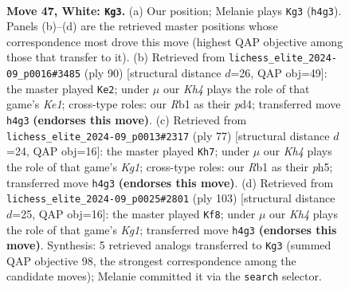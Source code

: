\documentclass[11pt]{article}
\begin{document}
\clearpage

\begin{figure}[p]\centering
\begin{subfigure}{0.46\textwidth}\centering
\resizebox{\linewidth}{!}{%
\newchessgame
\chessboard[
  setfen={8/1R3p2/p3pk2/8/P3P2K/5P1P/7r/1R6 w - - 0 47},
  showmover=false,
  pgfstyle=straightmove, color=movearrow, markmove={h4-g3}
]}
\caption{}
\end{subfigure}\hfill
\begin{subfigure}{0.46\textwidth}\centering
\resizebox{\linewidth}{!}{%
\newchessgame
\chessboard[
  setfen={8/1p6/4pk2/1R6/1P1pPP2/1r1P4/8/4K3 w - - 3 46},
  showmover=false,
  pgfstyle=straightmove, color=movearrow, markmove={e1-e2}
]}
\caption{}
\end{subfigure}
\\[4pt]
\begin{subfigure}{0.46\textwidth}\centering
\resizebox{\linewidth}{!}{%
\newchessgame
\chessboard[
  setfen={6k1/R5p1/5p2/7P/6P1/p4K2/r4P2/8 b - - 0 39},
  showmover=false,
  pgfstyle=straightmove, color=movearrow, markmove={g8-h7}
]}
\caption{}
\end{subfigure}\hfill
\begin{subfigure}{0.46\textwidth}\centering
\resizebox{\linewidth}{!}{%
\newchessgame
\chessboard[
  setfen={6k1/1R4p1/7p/7P/1p3P1K/1r4P1/8/8 b - - 1 52},
  showmover=false,
  pgfstyle=straightmove, color=movearrow, markmove={g8-f8}
]}
\caption{}
\end{subfigure}
\caption{\textbf{Move 47, White: \texttt{Kg3}.} (a) Our position; Melanie plays \texttt{Kg3} (\texttt{h4g3}). Panels (b)--(d) are the retrieved master positions whose correspondence most drove this move (highest QAP objective among those that transfer to it). (b) Retrieved from \texttt{lichess\_elite\_2024-09\_p0016\#3485} (ply 90) [structural distance $d$=26, QAP obj=49]: the master played \texttt{Ke2}; under $\mu$ our \emph{Kh4} plays the role of that game's \emph{Ke1}; cross-type roles: our \emph{R}b1 as their \emph{p}d4; transferred move \texttt{h4g3} \textbf{(endorses this move)}. (c) Retrieved from \texttt{lichess\_elite\_2024-09\_p0013\#2317} (ply 77) [structural distance $d$=24, QAP obj=16]: the master played \texttt{Kh7}; under $\mu$ our \emph{Kh4} plays the role of that game's \emph{Kg1}; cross-type roles: our \emph{R}b1 as their \emph{p}h5; transferred move \texttt{h4g3} \textbf{(endorses this move)}. (d) Retrieved from \texttt{lichess\_elite\_2024-09\_p0025\#2801} (ply 103) [structural distance $d$=25, QAP obj=16]: the master played \texttt{Kf8}; under $\mu$ our \emph{Kh4} plays the role of that game's \emph{Kg1}; transferred move \texttt{h4g3} \textbf{(endorses this move)}. Synthesis: 5 retrieved analogs transferred to \texttt{Kg3} (summed QAP objective 98, the strongest correspondence among the candidate moves); Melanie committed it via the \texttt{search} selector.}
\label{fig:thought-m92}
\end{figure}
\end{document}

